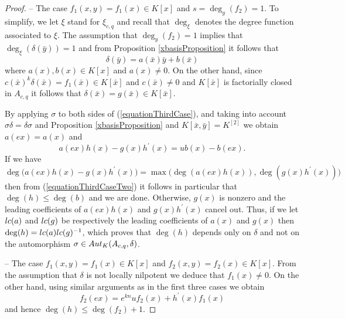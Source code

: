 \documentclass[10pt,a4paper]{amsart}
\newcommand \auto {{\rm Aut}}
\newcommand \lc {{\rm lc}}
\renewcommand \a {A}
\renewcommand \k {K}
\begin{document}
\begin{proof}
	\medskip -- The case $f_1(x,y)=f_1(x)\in\k[x]$ and $s=\deg_y(f_2)=1$. To simplify, we let $\xi$ stand for $\xi_{c,q}$ and recall that $\deg_{\xi}$ denotes the degree function associated to $\xi$. The assumption that $\deg_y(f_2)=1$ implies that $\deg_{\xi}(\delta(\bar{y}))=1$ and from Proposition \ref{xbasisProposition} it follows that \begin{equation}\label{equationThirdCase}\delta(\bar{y})=a(\bar{x})\bar{y}+b(\bar{x})\end{equation} where $a(x),b(x)\in\k[x]$ and $a(x)\neq 0$. On the other hand, since $c(\bar{x})^k\delta(\bar{x})=f_1(\bar{x})\in\k[\bar{x}]$ and $c(\bar{x})\neq 0$ and $\k[\bar{x}]$ is factorially closed in $\a_{c,q}$ it follows that $\delta(\bar{x})=g(\bar{x})\in\k[\bar{x}]$.
	
	\medskip By applying $\sigma$ to both sides of (\ref{equationThirdCase}), and taking into account $\sigma\delta=\delta\sigma$ and Proposition \ref{xbasisProposition} and $\k[\bar{x},\bar{y}]=\k^{[2]}$ we obtain $a(ex)=a(x)$ and \begin{equation}\label{equationThirdCaseTwo}a(ex)h(x)-g(x)h^{\prime}(x)=ub(x)-b(ex).
	\end{equation} 
	If we have $$\deg\big(a(ex)h(x)-g(x)h^{\prime}(x)\big)=\max\big(\deg(a(ex)h(x)),\deg(g(x)h^{\prime}(x))\big)$$ then from (\ref{equationThirdCaseTwo}) it follows in particular that $\deg(h)\leq \deg(b)$ and we are done. Otherwise, $g(x)$ is nonzero and the leading coefficients of $a(ex)h(x)$ and $g(x)h^{\prime}(x)$ cancel out. Thus, if we let $\lc(a)$ and $\lc(g)$ be respectively the leading coefficients of $a(x)$ and $g(x)$ then $\deg(h)=\lc(a)\lc(g)^{-1}$, which proves that $\deg(h)$ depends only on $\delta$ and not on the automorphism $\sigma\in\auto_{\k}(\a_{c,q},\delta)$.
	
	\medskip -- The case $f_1(x,y)=f_1(x)\in\k[x]$ and $f_2(x,y)=f_2(x)\in\k[x]$. From the assumption that $\delta$ is not locally nilpotent we deduce that $f_1(x)\neq 0$. On the other hand, using similar arguments as in the first three cases we obtain $$f_2(ex)=e^{kn}uf_2(x)+h^{\prime}(x)f_1(x)$$ and hence $\deg(h)\leq \deg(f_2)+1$.
\end{proof}
\end{document}
